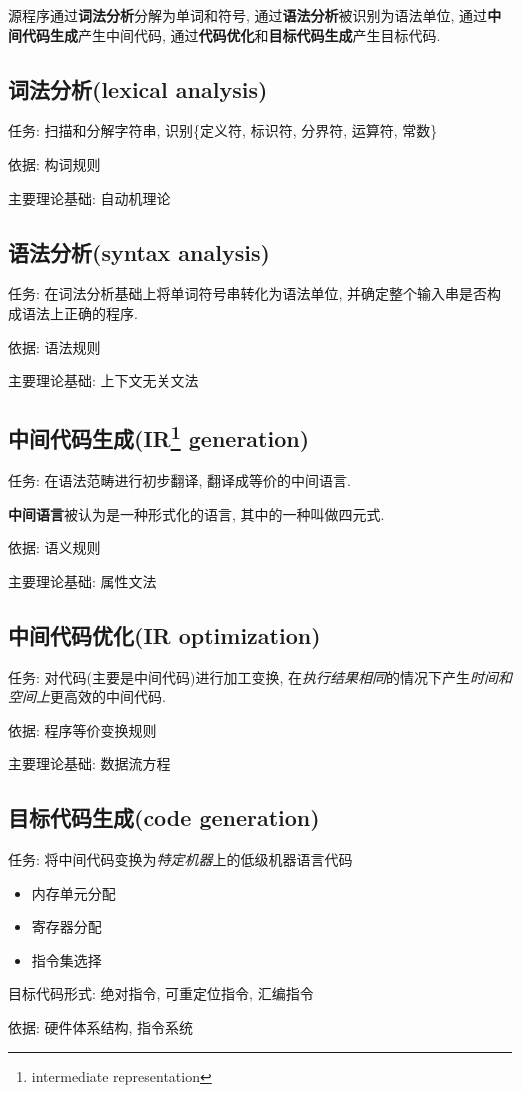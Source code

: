         源程序通过\textbf{词法分析}分解为单词和符号, 通过\textbf{语法分析}被识别为语法单位, 通过\textbf{中间代码生成}产生中间代码, 通过\textbf{代码优化}和\textbf{目标代码生成}产生目标代码.

    \subsection{词法分析(lexical analysis)}

        任务: 扫描和分解字符串, 识别\{定义符, 标识符, 分界符, 运算符, 常数\}

        依据: 构词规则

        主要理论基础: 自动机理论

    \subsection{语法分析(syntax analysis)}

        任务: 在词法分析基础上将单词符号串转化为语法单位, 并确定整个输入串是否构成语法上正确的程序.

        依据: 语法规则

        主要理论基础: 上下文无关文法

    \subsection{中间代码生成(IR\protect\footnote{intermediate representation} generation)}

        任务: 在语法范畴进行初步翻译, 翻译成等价的中间语言.

        \textbf{中间语言}被认为是一种形式化的语言, 其中的一种叫做四元式.

        依据: 语义规则

        主要理论基础: 属性文法

    \subsection{中间代码优化(IR optimization)}

        任务: 对代码(主要是中间代码)进行加工变换, 在\textsl{执行结果相同}的情况下产生\textsl{时间和空间上}更高效的中间代码.

        依据: 程序等价变换规则

        主要理论基础: 数据流方程

    \subsection{目标代码生成(code generation)}

        任务: 将中间代码变换为\textsl{特定机器}上的低级机器语言代码

        \begin{itemize}
            \item 内存单元分配
            \item 寄存器分配
            \item 指令集选择
        \end{itemize}

        目标代码形式: 绝对指令, 可重定位指令, 汇编指令

        依据: 硬件体系结构, 指令系统

